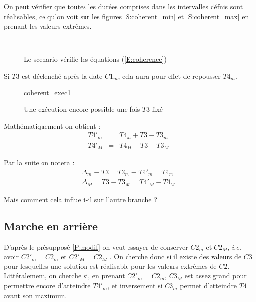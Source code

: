 \documentclass[10pt,a4paper]{article}
\begin{document}
On peut vérifier que toutes les durées comprises dans les intervalles défnis sont réalisables, ce qu'on voit sur les figures \ref{S:coherent_min} et \ref{S:coherent_max} en prenant les valeurs extrêmes.

	\begin{figure}[htp]
	\centering
		 \\
	\caption{Le scenario vérifie les équations (\ref{E:coherence})}
	\end{figure}

Si $T3$ est déclenché après la date $C1_m$, cela aura pour effet de repousser $T4_m$.
	
	\begin{figure}[htp]
	\centering
		
		\schemaScenario coherent_exec1
		\caption{Une exécution encore possible une fois $T3$ fixé}
		\label{S:coherent_exec1}
	\end{figure}

Mathématiquement on obtient :
	\begin{eqnarray}
		T4'_m &=& T4_m + T3 - T3_m \\
		T4'_M &=& T4_M + T3 - T3_M \nonumber
		\label{E:simplePropagation}
	\end{eqnarray}
	
	Par la suite on notera :
	\begin{eqnarray}
		\Delta{}_m = T3 - T3_m = T4'_m - T4_m \\
		\Delta{}_M = T3 - T3_M = T4'_M - T4_M \nonumber
		\label{E:delta}
	\end{eqnarray}

Mais comment cela influe t-il sur l'autre branche ?

	\subsection{Marche en arrière}

D'après le présupposé \ref{P:modif} on veut essayer de conserver $C2_m$ et $C2_M$, \textit{i.e.} avoir $C2'_m = C2_m$ et $C2'_M = C2_M$ . On cherche donc si il existe des valeurs de $C3$ pour lesquelles une solution est réalisable pour les valeurs extrêmes de $C2$. Littéralement, on cherche si, en prenant $C2'_m = C2_m$, $C3_M$ est assez grand pour permettre encore d'atteindre $T4'_m$, et inversement si $C3_m$ permet d'atteindre $T4$ avant son maximum.
\end{document}
